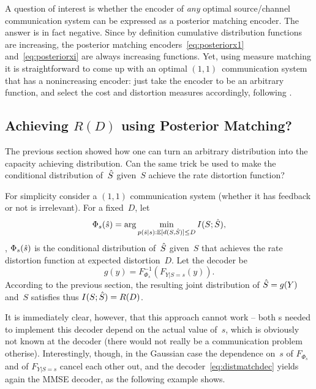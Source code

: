 \begin{remark}
  \label{rem:alwaysdistmatch}
  A question of interest is whether the encoder of \emph{any} optimal
  source/channel communication system can be expressed as a posterior matching
  encoder. The answer is in fact negative. Since by definition cumulative
  distribution functions are increasing, the posterior matching
  encoders~\eqref{eq:posteriorx1} and~\eqref{eq:posteriorxi} are always
  increasing functions. Yet, using measure matching it is straightforward to
  come up with an optimal $(1,1)$~communication system that has a nonincreasing
  encoder: just take the encoder to be an arbitrary function, and select the
  cost and distortion measures accordingly, following .
\end{remark}


\subsection{Achieving $R(D)$ using Posterior Matching?}

The previous section showed how one can turn an arbitrary distribution into the
capacity achieving distribution. Can the same trick be used to make the
conditional distribution of~${\hat{S}}$ given~$S$ achieve the rate distortion
function? 

For simplicity consider a $(1,1)$ communication system (whether it has feedback
or not is irrelevant). For a fixed~$D$, let
\begin{equation*}
  \Phi_s({\hat{s}}) = \arg\min_{p({\hat{s}}|s): \mathbb{E}[d(S,{\hat{S}})] \le D} I(S;{\hat{S}}),
\end{equation*}
\ie, $\Phi_s({\hat{s}})$ is the conditional distribution of~${\hat{S}}$ given~$S$ that
achieves the rate distortion function at expected distortion~$D$. Let the
decoder be
\begin{equation}
  \label{eq:distmatchdec}
  g(y) = F_{\Phi_s}^{-1}(F_{Y|S=s}(y)).
\end{equation}
According to the previous section, the resulting joint distribution of ${\hat{S}} =
g(Y)$ and~$S$ satisfies thus $I(S;{\hat{S}}) = R(D)$. 

It is immediately clear, however, that this approach cannot work -- both \cdf s
needed to implement this decoder depend on the actual value of~$s$, which is
obviously not known at the decoder (there would not really be a communication
problem otherise). Interestingly, though, in the Gaussian case the dependence
on~$s$ of $F_{\Phi_s}$ and of $F_{Y|S=s}$ cancel each other out, and the
decoder~\eqref{eq:distmatchdec} yields again the MMSE decoder, as the following
example shows.

